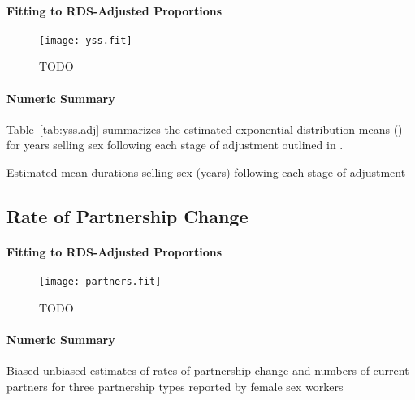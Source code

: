 \paragraph{Fitting to RDS-Adjusted Proportions}
\begin{figure}[h]
  \centering\texttt{[image: yss.fit]}
  \caption{TODO}
\end{figure}
\paragraph{Numeric Summary}
Table~\ref{tab:yss.adj} summarizes the estimated exponential distribution means (\ci)
for years selling sex following each stage of adjustment outlined in .
\begin{table}[h]
  \centering
  \caption{Estimated mean durations selling sex (years) following each stage of adjustment}
  
  \label{tab:yss.adj}
\end{table}
\subsection{Rate of Partnership Change}\label{app.partners}
\paragraph{Fitting to RDS-Adjusted Proportions}
\begin{figure}[h]
  \centering\texttt{[image: partners.fit]}
  \caption{TODO}
\end{figure}
\paragraph{Numeric Summary}
\begin{table}[h]
  \centering
  \caption{Biased \vs unbiased estimates of
    rates of partnership change and numbers of current partners
    for three partnership types reported by female sex workers}
  
  \label{tab:partners.fsw}
\end{table}
